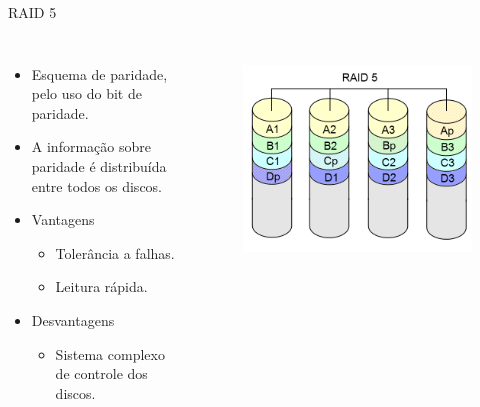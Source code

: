 \begin{frame}{RAID 5}
	\begin{columns}
		\begin{itemize}
			\item Esquema de paridade, pelo uso do bit de paridade.
			\item A informação sobre paridade é distribuída entre todos os discos.
			\item Vantagens
			\begin{itemize}
				\item Tolerância a falhas.
				\item Leitura rápida.
			\end{itemize}
			\item Desvantagens
			\begin{itemize}
				\item Sistema complexo de controle dos discos.
			\end{itemize}
		\end{itemize}
		
		\begin{figure}
			\includegraphics[width=\textwidth]{imagens/RAID_5}
			\label{fig:exemplo}
		\end{figure}
		
	\end{columns}
\end{frame}